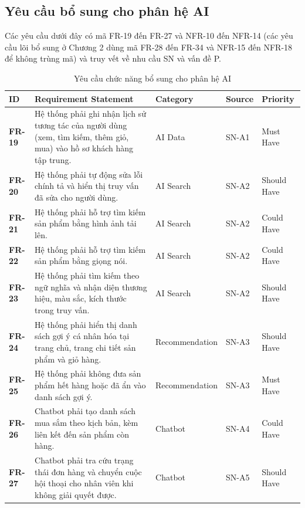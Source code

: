 \documentclass[12pt,a4paper,oneside]{report}
\begin{document}
\subsection{Yêu cầu bổ sung cho phân hệ AI}

Các yêu cầu dưới đây có mã FR-19 đến FR-27 và NFR-10 đến NFR-14 (các yêu cầu lõi bổ sung ở Chương 2 dùng mã FR-28 đến FR-34 và NFR-15 đến NFR-18 để không trùng mã) và truy vết về nhu cầu SN và vấn đề P.

\begin{longtable}{p{1.6cm}p{7.6cm}p{2.8cm}p{1.8cm}p{2.2cm}}
\caption{Yêu cầu chức năng bổ sung cho phân hệ AI}\\
\toprule
\textbf{ID} & \textbf{Requirement Statement} & \textbf{Category} & \textbf{Source} & \textbf{Priority} \\
\midrule
\endhead
\bottomrule
\endlastfoot
\textbf{FR-19} & Hệ thống phải ghi nhận lịch sử tương tác của người dùng (xem, tìm kiếm, thêm giỏ, mua) vào hồ sơ khách hàng tập trung. & AI Data & SN-A1 & Must Have \\
\textbf{FR-20} & Hệ thống phải tự động sửa lỗi chính tả và hiển thị truy vấn đã sửa cho người dùng. & AI Search & SN-A2 & Should Have \\
\textbf{FR-21} & Hệ thống phải hỗ trợ tìm kiếm sản phẩm bằng hình ảnh tải lên. & AI Search & SN-A2 & Could Have \\
\textbf{FR-22} & Hệ thống phải hỗ trợ tìm kiếm sản phẩm bằng giọng nói. & AI Search & SN-A2 & Could Have \\
\textbf{FR-23} & Hệ thống phải tìm kiếm theo ngữ nghĩa và nhận diện thương hiệu, màu sắc, kích thước trong truy vấn. & AI Search & SN-A2 & Should Have \\
\textbf{FR-24} & Hệ thống phải hiển thị danh sách gợi ý cá nhân hóa tại trang chủ, trang chi tiết sản phẩm và giỏ hàng. & Recommendation & SN-A3 & Should Have \\
\textbf{FR-25} & Hệ thống phải không đưa sản phẩm hết hàng hoặc đã ẩn vào danh sách gợi ý. & Recommendation & SN-A3 & Must Have \\
\textbf{FR-26} & Chatbot phải tạo danh sách mua sắm theo kịch bản, kèm liên kết đến sản phẩm còn hàng. & Chatbot & SN-A4 & Could Have \\
\textbf{FR-27} & Chatbot phải tra cứu trạng thái đơn hàng và chuyển cuộc hội thoại cho nhân viên khi không giải quyết được. & Chatbot & SN-A5 & Should Have \\
\end{longtable}
\end{document}
